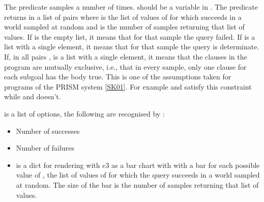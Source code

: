 \documentclass[letterpaper,10pt,english]{sphinxmanual}
\begin{document}
\sphinxAtStartPar
The predicate samples  a number of  times.  should be a variable in .
The predicate returns in  a list of pairs  where  is the list of values of  for which  succeeds in a world sampled at random and  is the number of samples returning that list of values. If  is the empty list, it means that for that sample the query failed.
If  is a list with a single element, it means that for that sample the query is determinate.
If, in all pairs ,  is a list with a single element, it means that the clauses in the program are mutually exclusive, i.e., that in every sample, only one clause for each subgoal has the body true.
This is one of the assumptions taken for programs of the PRISM system {[}\hyperlink{cite.index:id50}{SK01}{]}.
For example  and  satisfy this constraint while  and  doesn’t.

\sphinxAtStartPar
{} is a list of options, the following are recognised by :
\begin{itemize}
\item {} 
\sphinxAtStartPar
{} Number of successes

\item {} 
\sphinxAtStartPar
{} Number of failures

\item {} 
\sphinxAtStartPar
{}  is a dict for rendering with c3 as a bar chart with with a bar for each possible value of , the list of values of  for which the query succeeds in a world sampled at random. The size of the bar is the number of samples returning that list of values.

\end{itemize}
\end{document}
